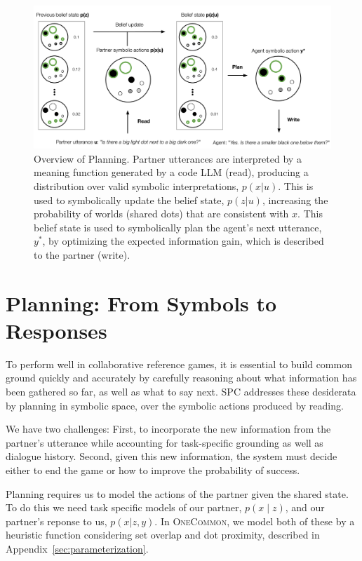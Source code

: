 \documentclass[11pt]{article}
\newcommand{\system}{SPC}
\begin{document}
\begin{figure}[t]
\centering
\includegraphics[width=2\columnwidth]{imgs/system-diagram.pdf}
\caption{
\label{fig:system}
Overview of Planning.
Partner utterances are interpreted by a meaning function generated by a code LLM (read), producing a distribution over valid symbolic interpretations, $p(x|u)$.
This is used to symbolically update the belief state, $p(z|u)$, increasing the probability of worlds (shared dots) that are consistent with $x$.
This belief state is used to symbolically plan the agent's next utterance, $y^*$, by optimizing the expected information gain, which is described to the partner (write).
}			
\end{figure}

\section{Planning: From Symbols to Responses}

To perform well in collaborative reference games, it is essential to build common ground quickly and accurately by carefully reasoning about what information has been gathered so far, as well as what to say next.
\system{} addresses these desiderata by planning in symbolic space, over the symbolic actions produced by reading.

We have two challenges: First, to incorporate the new information from the partner's utterance while accounting for task-specific grounding as well as dialogue history. Second, given this new information, the system must decide either to end the game or how to improve the probability of success.

Planning requires us to model the actions of the partner given the shared state. To do this we need task specific models of our partner, $p(x \mid z)$, and our partner's reponse to us, $p(x | z, y)$.  In \textsc{OneCommon}, we model both of these by a heuristic function considering set overlap and dot proximity, described in Appendix~\ref{sec:parameterization}.
\end{document}

